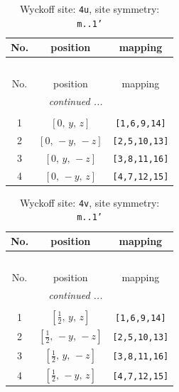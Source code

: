 \documentclass[fleqn,8pt]{jsarticle}
\begin{document}
\begin{longtable}{ccc}
\caption{Wyckoff site: {\tt 4u}, site symmetry: {\tt m..1'}}
 \\
 \hline \hline
No. & position & mapping \\ \hline \endfirsthead

\multicolumn{2}{l}{\tablename\ \thetable{}} \\
 \hline \hline
No. & position & mapping \\ \hline \endhead

 \hline \hline
\multicolumn{2}{r}{\footnotesize\it continued ...} \\ \endfoot

 \hline \hline
\multicolumn{2}{r}{} \\ \endlastfoot

1 & $\left[ 0,\, y,\, z \right]$ & {\tt [1,6,9,14]} \\ \hline
2 & $\left[ 0,\, - y,\, - z \right]$ & {\tt [2,5,10,13]} \\ \hline
3 & $\left[ 0,\, y,\, - z \right]$ & {\tt [3,8,11,16]} \\ \hline
4 & $\left[ 0,\, - y,\, z \right]$ & {\tt [4,7,12,15]} \\
\end{longtable}
\renewcommand{\arraystretch}{1.2}
\begin{longtable}{ccc}
\caption{Wyckoff site: {\tt 4v}, site symmetry: {\tt m..1'}}
 \\
 \hline \hline
No. & position & mapping \\ \hline \endfirsthead

\multicolumn{2}{l}{\tablename\ \thetable{}} \\
 \hline \hline
No. & position & mapping \\ \hline \endhead

 \hline \hline
\multicolumn{2}{r}{\footnotesize\it continued ...} \\ \endfoot

 \hline \hline
\multicolumn{2}{r}{} \\ \endlastfoot

1 & $\left[ \frac{1}{2},\, y,\, z \right]$ & {\tt [1,6,9,14]} \\ \hline
2 & $\left[ \frac{1}{2},\, - y,\, - z \right]$ & {\tt [2,5,10,13]} \\ \hline
3 & $\left[ \frac{1}{2},\, y,\, - z \right]$ & {\tt [3,8,11,16]} \\ \hline
4 & $\left[ \frac{1}{2},\, - y,\, z \right]$ & {\tt [4,7,12,15]} \\
\end{longtable}
\end{document}
